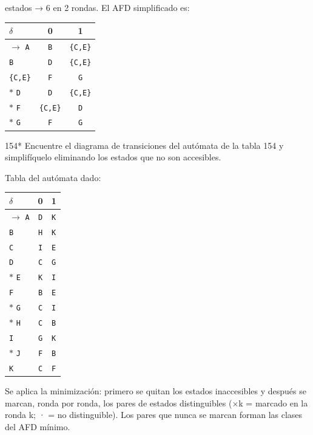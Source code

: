 \documentclass[11pt]{article}
\begin{document}
 estados → 6 en 2 rondas. El AFD simplificado es:
\begin{center}\small\begin{tabular}{lcc}\toprule
$\delta$ & 0 & 1 \\\midrule
$\to$ \texttt{A} & \texttt{B} & \texttt{\{C,E\}} \\
 \texttt{B} & \texttt{D} & \texttt{\{C,E\}} \\
 \texttt{\{C,E\}} & \texttt{F} & \texttt{G} \\
$*$ \texttt{D} & \texttt{D} & \texttt{\{C,E\}} \\
$*$ \texttt{F} & \texttt{\{C,E\}} & \texttt{D} \\
$*$ \texttt{G} & \texttt{F} & \texttt{G} \\
\bottomrule\end{tabular}\end{center}



\begin{ejercicio}{154}{*}
Encuentre el diagrama de transiciones del autómata de la tabla 154 y simplifíquelo eliminando los estados que no son accesibles.
\end{ejercicio}
\proc Tabla del autómata dado:
\begin{center}\small\begin{tabular}{lcc}\toprule
$\delta$ & 0 & 1 \\\midrule
$\to$ \texttt{A} & \texttt{D} & \texttt{K} \\
 \texttt{B} & \texttt{H} & \texttt{K} \\
 \texttt{C} & \texttt{I} & \texttt{E} \\
 \texttt{D} & \texttt{C} & \texttt{G} \\
$*$ \texttt{E} & \texttt{K} & \texttt{I} \\
 \texttt{F} & \texttt{B} & \texttt{E} \\
$*$ \texttt{G} & \texttt{C} & \texttt{I} \\
$*$ \texttt{H} & \texttt{C} & \texttt{B} \\
 \texttt{I} & \texttt{G} & \texttt{K} \\
$*$ \texttt{J} & \texttt{F} & \texttt{B} \\
 \texttt{K} & \texttt{C} & \texttt{F} \\
\bottomrule\end{tabular}\end{center}
Se aplica la minimización: primero se quitan los estados inaccesibles y después se marcan, ronda por ronda, los pares de estados distinguibles (×k = marcado en la ronda k; · = no distinguible). Los pares que nunca se marcan forman las clases del AFD mínimo.
\end{document}
